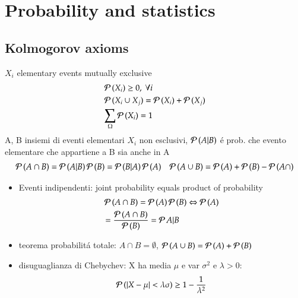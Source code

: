 \documentclass[main.tex]{subfiles}
\begin{document}
\chapter{Probability and statistics}

\section{Kolmogorov axioms}
$X_i$ elementary events mutually exclusive
\begin{align*}
&\operatorname{\mathcal{P}}{(X_i)}\geq0,\ \forall i\\
&\operatorname{\mathcal{P}}{(X_i\cup X_j)}=\operatorname{\mathcal{P}}{(X_i)}+\operatorname{\mathcal{P}}{(X_j)}\\
&\sum_{\Omega}\operatorname{\mathcal{P}}{(X_i)}=1
\end{align*}
A, B insiemi di eventi elementari $X_i$ non esclusivi, $\operatorname{\mathcal{P}}{(A|B)}$ \'e prob. che evento elementare che appartiene a B sia anche in A
\begin{align*}
&\operatorname{\mathcal{P}}{(A\cap B)}=\operatorname{\mathcal{P}}{(A|B)}\operatorname{\mathcal{P}}{(B)}=\operatorname{\mathcal{P}}{(B|A)}\operatorname{\mathcal{P}}{(A)}
&\operatorname{\mathcal{P}}{(A\cup B)}=\operatorname{\mathcal{P}}{(A)}+\operatorname{\mathcal{P}}{(B)}-\operatorname{\mathcal{P}}{(A\cap)} 
\end{align*}
\begin{itemize}
\item Eventi indipendenti: joint probability equals product of probability
\begin{align*}
&\operatorname{\mathcal{P}}{(A\cap B)}=\operatorname{\mathcal{P}}{(A)}\operatorname{\mathcal{P}}{(B)}\Leftrightarrow \operatorname{\mathcal{P}}{(A)}\\
&=\frac{\operatorname{\mathcal{P}}{(A\cap B)}}{\operatorname{\mathcal{P}}{(B)}}=\operatorname{\mathcal{P}}{A|B}
\end{align*}
\item teorema probabilit\'a totale: $A\cap B=\emptyset$, $\operatorname{\mathcal{P}}{(A\cup B)}=\operatorname{\mathcal{P}}{(A)}+\operatorname{\mathcal{P}}{(B)}$
\item disuguaglianza di Chebychev: X ha media $\mu$ e var $\sigma^2$ e $\lambda>0$:
\[\operatorname{\mathcal{P}}{(|X-\mu|<\lambda\sigma)}\geq1-\frac{1}{\lambda^2}\]

\end{itemize}
\end{document}

